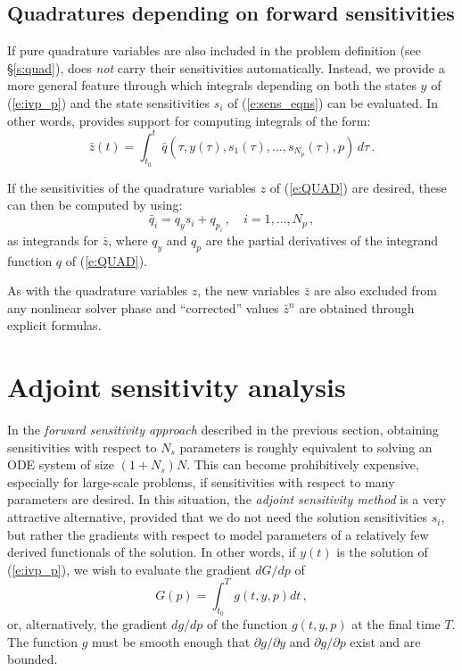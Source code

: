 \subsection{Quadratures depending on forward sensitivities}
If pure quadrature variables are also included in the problem definition
(see \S\ref{s:quad}), {\cvodes} does {\em not} carry their sensitivities 
automatically. Instead, we provide a more general feature through which
integrals depending on both the states $y$ of (\ref{e:ivp_p}) and the
state sensitivities $s_i$ of (\ref{e:sens_eqns}) can be evaluated. In other
words, {\cvodes} provides support for computing integrals of the form:
\begin{equation*}
 \bar z(t) = \int_{t_0}^t \bar q(\tau, y(\tau), s_1(\tau), \ldots, s_{N_p}(\tau),p) \, d\tau \, .
\end{equation*}

If the sensitivities of the quadrature variables $z$ of (\ref{e:QUAD}) are
desired, these can then be computed by using:
\begin{equation*}
  \bar q_i = q_y s_i + q_{p_i} \, , \quad i = 1,\ldots,N_p \, ,
\end{equation*}
as integrands for $\bar{z}$, where $q_y$ and $q_p$ are the partial derivatives
of the integrand function $q$ of (\ref{e:QUAD}).

As with the quadrature variables $z$, the new variables $\bar z$ are also excluded
from any nonlinear solver phase and ``corrected'' values $\bar z^n$ are obtained
through explicit formulas. 

\section{Adjoint sensitivity analysis}\label{ss:adj_sensi}
In the {\em forward sensitivity approach} described in the previous
section, obtaining sensitivities with respect to $N_s$ parameters is roughly
equivalent to solving an ODE system of size $(1+N_s) N$. This can become 
prohibitively expensive, especially for large-scale problems, if sensitivities
with respect to many parameters are desired.
In this situation, the {\em adjoint sensitivity method} is a very
attractive alternative, provided that we do not need the solution sensitivities
$s_i$, but rather the gradients with respect to model parameters of a relatively 
few derived functionals of the solution. In other words, if $y(t)$ is the solution
of (\ref{e:ivp_p}), we wish to evaluate the gradient ${dG}/{dp}$ of
\begin{equation}\label{e:G}
G(p) = \int_{t_0}^T g(t, y, p) dt \, ,
\end{equation}
or, alternatively, the gradient ${dg}/{dp}$ of the function $g(t, y, p)$ 
at the final time $T$. 
The function $g$ must be smooth enough that $\partial g / \partial y$ 
and $\partial g / \partial p$ exist and are bounded. 


